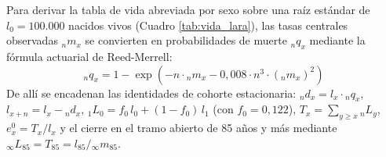 \documentclass[12pt,letterpaper]{article}
\begin{document}
Para derivar la tabla de vida abreviada por sexo sobre una raíz estándar de $l_0 = 100.000$ nacidos vivos (Cuadro \ref{tab:vida_lara}), las tasas centrales observadas ${}_n m_x$ se convierten en probabilidades de muerte ${}_n q_x$ mediante la fórmula actuarial de Reed-Merrell:
\begin{equation}
{}_n q_x = 1 - \exp\!\left( -n \cdot {}_n m_x - 0{,}008 \cdot n^3 \cdot ({}_n m_x)^2 \right)
\end{equation}
De allí se encadenan las identidades de cohorte estacionaria: ${}_n d_x = l_x \cdot {}_n q_x$, $l_{x+n} = l_x - {}_n d_x$, ${}_1 L_0 = f_0 \, l_0 + (1 - f_0) \, l_1$ (con $f_0 = 0,122$), $T_x = \sum_{y \ge x} {}_n L_y$, $e_x^0 = T_x / l_x$ y el cierre en el tramo abierto de 85 años y más mediante ${}_\infty L_{85} = T_{85} = l_{85} / {}_\infty m_{85}$.
\end{document}
